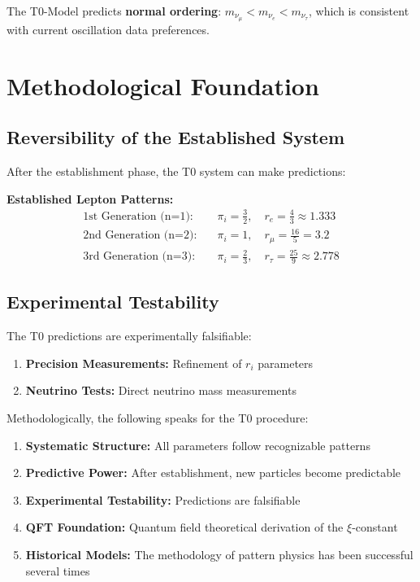 	\begin{important}
		The T0-Model predicts \textbf{normal ordering}: $m_{\nu_\mu} < m_{\nu_e} < m_{\nu_\tau}$, which is consistent with current oscillation data preferences.
	\end{important}
	
	\section{Methodological Foundation}
	\label{sec:scientific_legitimacy}
	
	\subsection{Reversibility of the Established System}
	\label{subsec:reversibility}
	
	After the establishment phase, the T0 system can make predictions:
	
	\textbf{Established Lepton Patterns:}
	\begin{align}
		\text{1st Generation (n=1):} \quad &\pi_i = \frac{3}{2}, \quad r_e = \frac{4}{3} \approx 1.333 \\
		\text{2nd Generation (n=2):} \quad &\pi_i = 1, \quad r_\mu = \frac{16}{5} = 3.2 \\
		\text{3rd Generation (n=3):} \quad &\pi_i = \frac{2}{3}, \quad r_\tau = \frac{25}{9} \approx 2.778
	\end{align}
		
	\subsection{Experimental Testability}
	\label{subsec:experimental_testability}
	
	The T0 predictions are experimentally falsifiable:
	
	\begin{enumerate}
		\item \textbf{Precision Measurements:} Refinement of $r_i$ parameters
		\item \textbf{Neutrino Tests:} Direct neutrino mass measurements
	\end{enumerate}
	
	Methodologically, the following speaks for the T0 procedure:
	
	\begin{enumerate}
		\item \textbf{Systematic Structure:} All parameters follow recognizable patterns
		\item \textbf{Predictive Power:} After establishment, new particles become predictable
		\item \textbf{Experimental Testability:} Predictions are falsifiable
		\item \textbf{QFT Foundation:} Quantum field theoretical derivation of the $\xi$-constant
		\item \textbf{Historical Models:} The methodology of pattern physics has been successful several times
	\end{enumerate}
	
